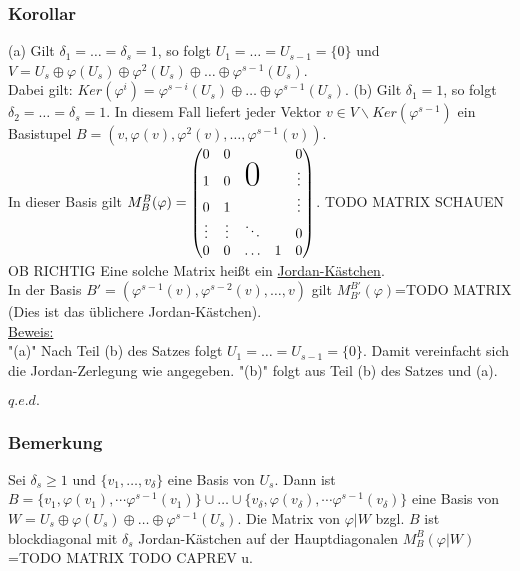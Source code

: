 \documentclass[a4paper]{article}
\newcommand{\ul}{\underline}
\renewcommand{\proof}{\ul{Beweis:}\\}
\renewcommand{\qed}{\begin{flushright}
\ul{\(q.e.d.\)}
\end{flushright}}
\let\phi\varphi
\begin{document}
\subsubsection{Korollar}
(a) Gilt \(\delta_1=\dots=\delta_s=1\), so folgt \(U_1=\dots=U_{s-1}=\{0\}\) und \(V=U_s\oplus \phi(U_s)\oplus\phi^2(U_s)\oplus\dots\oplus\phi^{s-1}(U_s)\).\\
Dabei gilt: \(Ker(\phi^i)=\phi^{s-i}(U_s)\oplus\dots\oplus\phi^{s-1}(U_s)\).
(b) Gilt \(\delta_1=1\), so folgt \(\delta_2=\dots=\delta_s=1\). In diesem Fall liefert jeder Vektor \(v\in V\backslash Ker(\phi^{s-1})\) ein Basistupel \(B=(v,\phi(v),\phi^2(v),\dots,\phi^{s-1}(v))\).\\
In dieser Basis gilt \(M_B^B(\phi)=\begin{pmatrix}
0 & 0 & & & 0\\
1 & 0 & \mbox{\Huge 0} & & \vdots\\
0 & 1 & & & \vdots\\
\vdots & \vdots & \ddots & & 0\\
0 & 0 & \hdots & 1 & 0
\end{pmatrix}\). TODO MATRIX SCHAUEN OB RICHTIG
Eine solche Matrix heißt ein \ul{Jordan-Kästchen}.\\
In der Basis \(B'=(\phi^{s-1}(v),\phi^{s-2}(v),\dots,v)\) gilt \(M_{B'}^{B'}(\phi)\)=TODO MATRIX (Dies ist das üblichere Jordan-Kästchen).\\
\proof
"(a)" Nach Teil (b) des Satzes folgt \(U_1=\dots=U_{s-1}=\{0\}\). Damit vereinfacht sich die Jordan-Zerlegung wie angegeben.
"(b)" folgt aus Teil (b) des Satzes und (a).
\qed
\subsubsection{Bemerkung}
Sei \(\delta_s\geq 1\) und \(\{v_1,\dots,v_\delta\}\) eine Basis von \(U_s\). Dann ist \(B=\{v_1,\phi(v_1),\dotsm\phi^{s-1}(v_1)\}\cup\dots\cup\{v_\delta,\phi(v_\delta),\dotsm\phi^{s-1}(v_\delta)\}\) eine Basis von \(W=U_s\oplus\phi(U_s)\oplus\dots\oplus\phi^{s-1}(U_s)\). Die Matrix von \(\phi|W\) bzgl. \(B\) ist blockdiagonal mit \(\delta_s\) Jordan-Kästchen auf der Hauptdiagonalen \(M_B^B(\phi|W)\)=TODO MATRIX  TODO CAPREV u.\\
\end{document}
